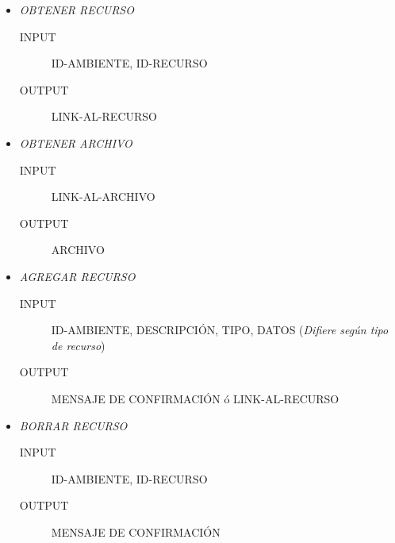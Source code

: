 \documentclass{article}
\begin{document}
\begin{description}
\begin{itemize}
\begin{description}
			\end{description}
			\item \emph{OBTENER RECURSO}
			\begin{description}
				\item[INPUT] ID-AMBIENTE, ID-RECURSO
				\item[OUTPUT] LINK-AL-RECURSO
			\end{description}
			\item \emph{OBTENER ARCHIVO}
			\begin{description}
				\item[INPUT] LINK-AL-ARCHIVO
				\item[OUTPUT] ARCHIVO
			\end{description}
			\item \emph{AGREGAR RECURSO}
			\begin{description}
				\item[INPUT] ID-AMBIENTE, DESCRIPCI\'ON, TIPO, DATOS (\emph{Difiere seg\'un tipo de recurso})
				\item[OUTPUT] MENSAJE DE CONFIRMACI\'ON \'o LINK-AL-RECURSO
			\end{description}
			\item \emph{BORRAR RECURSO}
			\begin{description}
				\item[INPUT] ID-AMBIENTE, ID-RECURSO
				\item[OUTPUT] MENSAJE DE CONFIRMACI\'ON
			\end{description}
		\end{itemize}
	\end{description}
\end{document}
